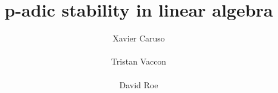 \documentclass{sig-alternate}
\begin{document}
\newtheorem{theo}{Theorem}[section]
\newtheorem{lem}[theo]{Lemma}
\newtheorem{prop}[theo]{Proposition}
\newtheorem{cor}[theo]{Corollary}
\newtheorem{quest}[theo]{Question}
\newtheorem{rem}[theo]{Remark}
\newtheorem{ex}[theo]{Example}
\newtheorem{deftn}[theo]{Definition}
\newtheorem{rmk}[theo]{Remark}

\newcommand{\N}{\mathbb N}
\newcommand{\Z}{\mathbb Z}
\newcommand{\Zp}{\Z_p}
\newcommand{\Q}{\mathbb Q}
\newcommand{\Qp}{\Q_p}
\newcommand{\Fp}{\mathbb{F}_p}
\newcommand{\R}{\mathbb R}
\renewcommand{\O}{\mathcal O}
\newcommand{\OK}{\mathcal{O}_K}
\newcommand{\XX}{\mathbf X}
\newcommand{\trans}{{}^{\text t}}
\newcommand{\T}{\mathcal{T}}

\renewcommand{\prec}{\text{\rm prec}}

\newcommand{\id}{\textrm{id}}
\newcommand{\Epi}{\textrm{Epi}}
\renewcommand{\c}{\text{\rm c}}

\newcommand{\low}{\text{\rm low}}
\newcommand{\up}{\text{\rm up}}

\newcommand{\detp}{\text{\rm det}'}
\newcommand{\DI}{\text{\rm DI}}
\newcommand{\II}{\text{\rm II}}

\newcommand{\lb}{\ensuremath{\llbracket}}
\newcommand{\rb}{\ensuremath{\rrbracket}}
\newcommand{\lp}{(\!(}
\newcommand{\rp}{)\!)}
\newcommand{\col}{\: : \:}

\def\todo#1{\ \!\!{\color{red} #1}}
\def\todofor#1#2{\ \!\!{\color{purple} {\bf #1}: #2}}

\def\binom#1#2{\Big(\begin{array}{cc} #1 \\ #2 \end{array}\Big)}

\title{p-adic stability in linear algebra}

\author{
\alignauthor Xavier Caruso\\
  \\
\alignauthor Tristan Vaccon\\
  \\
\alignauthor David Roe \\
  \\
}

\maketitle
\end{document}
